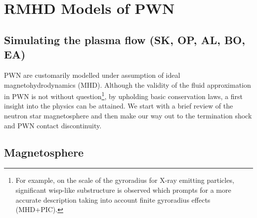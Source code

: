 
\section{RMHD Models of PWN}
\label{sec:rmhd}
\subsection{Simulating the plasma flow         (SK, OP, AL, BO, EA)}
PWN are customarily modelled under assumption of ideal magnetohydrodynamics (MHD).  Although the validity of the fluid approximation in PWN is not without question\footnote{For example, on the scale of the gyroradius for X-ray emitting particles, significant wisp-like substructure is observed which prompts for a more accurate description taking into account finite gyroradius effects (MHD+PIC).}, by upholding basic conservation laws, a first insight into the physics can be attained.  We start with a brief review of the neutron star magnetosphere and then make our way out to the termination shock and PWN contact discontinuity. 

\subsection{Magnetosphere}

